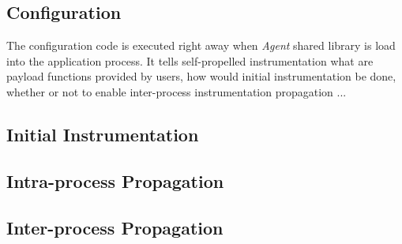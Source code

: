 \subsection{Configuration}
The configuration code is executed right away when {\em Agent} shared library is
load into the application process.
It tells self-propelled instrumentation what are payload functions provided by
users, how would initial instrumentation be done, whether or not to enable
inter-process instrumentation propagation ...

\subsection{Initial Instrumentation}

\subsection{Intra-process Propagation}

\subsection{Inter-process Propagation}
